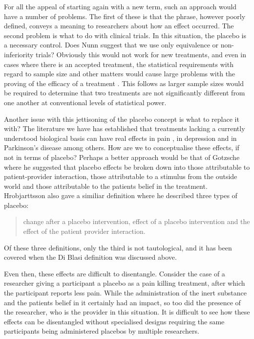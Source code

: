 For all the appeal of starting again with a new term, such an approach would have a number of problems. The first of these is  that the phrase, however poorly defined, conveys a meaning to researchers about how an effect occurred. 
The second problem is what to do with clinical trials. In this situation, the placebo is a necessary control. Does Nunn suggest that we use only equivalence or non-inferiority trials? Obviously this would not work for new treatments, and even in cases where there is an accepted treatment, the statistical requirements with regard to sample size and other matters would cause large problems with the proving of the efficacy of a treatment \cite{Benedetti2008}. This follows as larger sample sizes would be required to determine that two treatments are not significantly different from one another at conventional levels of statistical power. %

Another issue with this jettisoning of the placebo concept is what to replace it with? The literature we have has established that  treatments lacking a currently understood biological basis can have real effects \cite{Meissner2007}  in pain \cite{Vase2002} , in depression \cite{Kirsch2002a}  and in Parkinson's disease \cite{Benedetti2004a} among others. How are we to conceptualise these effects, if not in terms of placebo? Perhaps a better approach would be that of Gotzsche \cite{Gotzsche1995} where he suggested that placebo effects be broken down into those attributable to patient-provider interaction, those attributable to a stimulus from the outside world and those attributable to the patients belief in the treatment. Hrobjarttsson also gave a similiar definition where he described three types of placebo:

\begin{quotation}
change after a placebo intervention, effect of a placebo intervention and the effect of the patient provider interaction. 
\end{quotation}

Of these three definitions, only the third is not tautological, and it has been covered when the Di Blasi definition was discussed above. 

Even then, these effects are difficult to disentangle. Consider the case of a researcher giving a participant a placebo as a pain killing treatment, after which the participant reports less pain. While the administration of the inert substance and the patients belief in it certainly had an impact, so too did the presence of the researcher, who is the provider in this situation. It is difficult to see how these effects can be disentangled without specialised designs requiring the same participants being administered placebos by multiple researchers.   



